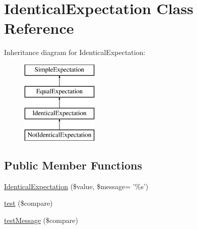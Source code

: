 \hypertarget{class_identical_expectation}{
\section{IdenticalExpectation Class Reference}
\label{class_identical_expectation}
}
Inheritance diagram for IdenticalExpectation:\begin{figure}[H]
\begin{center}
\leavevmode
\includegraphics[height=4.000000cm]{class_identical_expectation}
\end{center}
\end{figure}
\subsection*{Public Member Functions}
\begin{DoxyCompactItemize}
\item 
\hyperlink{class_identical_expectation_afe432a076cb2c4c1eaaeaab22bb6c63f}{IdenticalExpectation} (\$value, \$message= '\%s')
\item 
\hyperlink{class_identical_expectation_a6076cd232c16294ca0a7979ce11e57da}{test} (\$compare)
\item 
\hyperlink{class_identical_expectation_a80c36b4efb3126695a69d4823ab3122b}{testMessage} (\$compare)
\end{DoxyCompactItemize}


